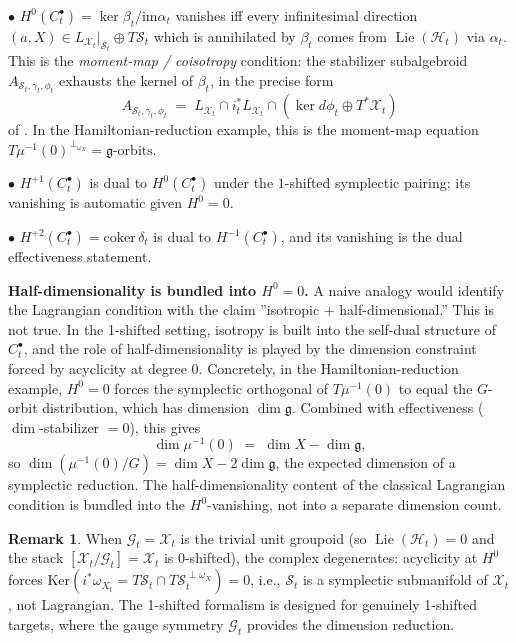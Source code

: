 \documentclass[reqno]{amsart}
\theoremstyle{plain}
\theoremstyle{definition}
\newtheorem{Rem}[Thm]{Remark}
\newcommand{\G}{\mathcal{G}}
\renewcommand{\H}{\mathcal{H}}
\renewcommand{\S}{\mathcal{S}}
\newcommand{\X}{\mathcal{X}}
\newcommand{\Ker}{\text{Ker}}
\newcommand{\Lie}{\operatorname{Lie}}
\begin{document}
\smallskip
$\bullet$\; $H^{0}(C_t^\bullet) = \ker \beta_t / \text{im} \alpha_t$ vanishes iff
every infinitesimal direction $(a, X) \in L_{\X_t}|_{\S_t} \oplus T\S_t$
which is annihilated by $\beta_t$ comes from $\Lie(\H_t)$ via $\alpha_t$.
This is the \emph{moment-map / coisotropy} condition: the stabilizer
subalgebroid $A_{\S_t,\gamma_t,\phi_t}$ exhausts the kernel of $\beta_t$,
in the precise form
\[
   A_{\S_t,\gamma_t,\phi_t}
   \;=\;
   L_{\X_t} \cap i_t^{*}L_{\X_t} \cap (\ker d\phi_t \oplus T^{*}\X_t)
\]
of \cite[Definition 2.1]{bualibanu2026reduction}. In the Hamiltonian-reduction
example, this is the moment-map equation
$T\mu^{-1}(0)^{\perp_{\omega_X}} = \mathfrak{g}\text{-orbits}$.
 
\smallskip
$\bullet$\; $H^{+1}(C_t^\bullet)$ is dual to $H^{0}(C_t^\bullet)$ under the
$1$-shifted symplectic pairing; its vanishing is automatic given $H^0 = 0$.
 
\smallskip
$\bullet$\; $H^{+2}(C_t^\bullet) = \mathrm{coker}\,\delta_t$ is dual to
$H^{-1}(C_t^\bullet)$, and its vanishing is the dual effectiveness
statement.
 
\medskip
\noindent\textbf{Half-dimensionality is bundled into $H^0 = 0$.}
A naive analogy would identify the Lagrangian condition with the claim ''isotropic $+$ half-dimensional.'' This is not true. In the
1-shifted setting, isotropy is built into the self-dual structure of
$C_t^\bullet$, and the role of half-dimensionality is played by the
dimension constraint forced by acyclicity at degree $0$. Concretely, in
the Hamiltonian-reduction example, $H^0 = 0$ forces the symplectic
orthogonal of $T\mu^{-1}(0)$ to equal the $G$-orbit distribution,
which has dimension $\dim \mathfrak{g}$. Combined with effectiveness
($\dim$-stabilizer $=0$), this gives
\[
   \dim \mu^{-1}(0) \;=\; \dim X - \dim \mathfrak{g},
\]
so $\dim(\mu^{-1}(0)/G) = \dim X - 2\dim\mathfrak{g}$, the expected
dimension of a symplectic reduction. The half-dimensionality content of
the classical Lagrangian condition is bundled into the $H^0$-vanishing,
not into a separate dimension count.
 
\begin{Rem}\label{rem:trivial-stack}
When $\mathcal{G}_t = \X_t$ is the trivial unit groupoid (so
$\Lie(\H_t) = 0$ and the stack $[\X_t/\mathcal{G}_t] = \X_t$ is
$0$-shifted), the complex degenerates: acyclicity at $H^0$ forces
$\Ker(i^{*}\omega_{X_t} = T\S_t \cap T\S_t^{\perp \omega_X}) = 0$, i.e., $\S_t$ is a symplectic submanifold of $\X_t$, not Lagrangian. The 1-shifted formalism is
designed for genuinely 1-shifted targets, where the gauge symmetry
$\G_t$ provides the dimension reduction.
\end{Rem}
\end{document}
